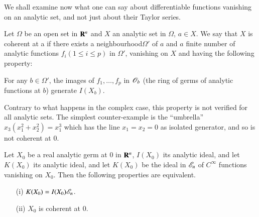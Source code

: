 We shall examine now what one can say about differentiable functions vanishing on an analytic set, and not just about their Taylor series.

\begin{definition}\label{chap6-defi3.9}
Let $\Omega$ be an open set in $\mathbf{R}^{n}$ and $X$ an analytic set in $\Omega$, $a\in X$. We say that $X$ is coherent at a if there exists a neighbourhood\pageoriginale $\Omega'$ of $a$ and $a$ finite number of analytic functions $f_{i}(1\leq i\leq p)$ in $\Omega'$, vanishing on $X$ and having the following property:

For any $b\in\Omega'$, the images of $f_{1},\ldots,f_{p}$ in $\mathscr{O}_{b}$ (the ring of germs of analytic functions at $b$) generate $I(X_{b})$.
\end{definition}

Contrary to what happens in the complex case, this property is not verified for all analytic sets. The simplest counter-example is the ``umbrella'' $x_{3}(x^{2}_{1}+x^{2}_{2})=x^{3}_{1}$ which has the line $x_{1}=x_{2}=0$ as isolated generator, and so is not coherent at $0$.

\begin{theorem}\label{chap6-thm3.10}
Let $X_{0}$ be a real analytic germ at $0$ in $\mathbf{R}^{n}$, $I(X_{0})$ its analytic ideal, and let $K(X_{0})$ its analytic ideal, and let $K(X_{0})$ be the ideal in $\mathscr{E}_{n}$ of $C^{\infty}$ functions vanishing on $X_{0}$. Then the following properties are equivalent.
\begin{itemize}
\item[\rm(i)] $K(X_{0})=I(X_{0})\mathscr{E}_{n}$.

\item[\rm(ii)] $X_{0}$ is coherent at $0$.
\end{itemize}
\end{theorem}

